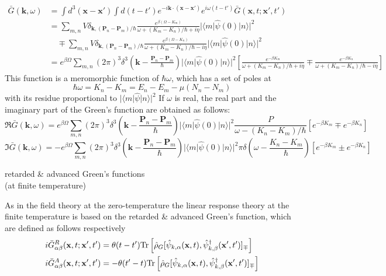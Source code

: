 \begin{equation}
\begin{aligned}
\bar{G} (\mathbf{k},\omega)&=\int d^3(\mathbf{x}-\mathbf{x}') \int d(t-t') e^{-i\mathbf{k}\cdot (\mathbf{x}-\mathbf{x}')} e^{i\omega(t-t')} \bar{G} (\mathbf{x},t;\mathbf{x}',t')\\
&=\sum_{m,n} V \delta_{\mathbf{k},(\mathbf{P}_n-\mathbf{P}_m)/\hbar} \frac{e^{\beta(\Omega-K_m)}}{\omega+(K_m-K_n)/\hbar +i\eta} |\langle m|\hat{\psi}(0) |n\rangle |^2\\
&\quad \mp \sum_{m,n} V \delta_{\mathbf{k},(\mathbf{P}_n-\mathbf{P}_m)/\hbar} \frac{e^{\beta(\Omega-K_n)}}{\omega+(K_m-K_n)/\hbar -i\eta} |\langle m|\hat{\psi}(0) |n\rangle |^2\\
&=e^{\beta\Omega} \sum_{m,n} (2\pi)^3 \delta^3 (\mathbf{k}-\frac{\mathbf{P}_n-\mathbf{P}_m}{\hbar})  |\langle m|\hat{\psi}(0) |n\rangle |^2 \left[ \frac{e^{-\beta K_m}}{\omega+(K_m-K_n)/\hbar +i\eta} \mp \frac{e^{-\beta K_n}}{\omega+(K_m-K_n)/\hbar -i\eta} \right]
\end{aligned}
\end{equation}
 This function is a meromorphic function of $\hbar \omega$, which has a set of poles at 
\[
\hbar \omega=K_n-K_m=E_n-E_m-\mu(N_n-N_m)
\]
with its residue proportional to $|\langle m|\hat \psi |n\rangle|^2$
 If $\omega$ is real, the real part and the imaginary part of the Green's function are obtained as follows:
\begin{equation}
\Re\bar G(\mathbf{k},\omega)=e^{\beta\Omega} \sum_{m,n} (2\pi)^3 \delta^3 (\mathbf{k}-\frac{\mathbf{P}_n-\mathbf{P}_m}{\hbar})  |\langle m|\hat{\psi}(0) |n\rangle |^2 \frac{P}{\omega-(K_n-K_m)/\hbar} [e^{-\beta K_m}\mp e^{-\beta K_n}]
\end{equation}
\begin{equation}
\Im\bar G(\mathbf{k},\omega)=-e^{\beta\Omega} \sum_{m,n} (2\pi)^3 \delta^3 (\mathbf{k}-\frac{\mathbf{P}_n-\mathbf{P}_m}{\hbar})  |\langle m|\hat{\psi}(0) |n\rangle |^2 \pi \delta(\omega-\frac{K_n-K_m}{\hbar}) [e^{-\beta K_m}\pm e^{-\beta K_n}]
\end{equation}
\begin{center}
retarded \& advanced Green's functions\\
(at finite temperature)
\end{center}
 As in the field theory at the zero-temperature the linear response theory at the finite temperature is based on the retarded \& advanced Green's function, which are defined as follows respectively
\begin{equation}
\begin{aligned}
i\bar G ^R_{\alpha\beta}(\mathbf{x},t;\mathbf{x}',t')&=\theta(t-t')\text{Tr} \left[ \hat\rho_G [\hat \psi_{k,\alpha}(\mathbf{x},t),\hat\psi_{k,\beta}^\dag(\mathbf{x}',t')]_\mp \right]\\
i\bar G ^A_{\alpha\beta}(\mathbf{x},t;\mathbf{x}',t')&=-\theta(t'-t)\text{Tr} \left[ \hat\rho_G [\hat \psi_{k,\alpha}(\mathbf{x},t),\hat\psi_{k,\beta}^\dag(\mathbf{x}',t')]_\mp \right]\\
\end{aligned}
\end{equation}
